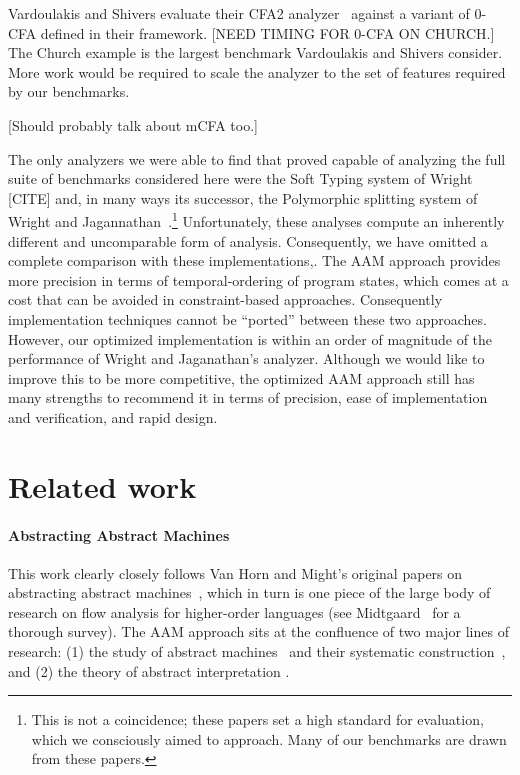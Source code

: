 \documentclass[preprint,onecolumn,9pt]{sigplanconf} %
\begin{document}
Vardoulakis and Shivers evaluate their CFA2
analyzer~\cite{dvanhorn:Vardoulakis2011CFA2} against a variant of 0-CFA
defined in their framework.  [NEED TIMING FOR 0-CFA ON CHURCH.]  The
Church example is the largest benchmark Vardoulakis and Shivers
consider.  More work would be required to scale the analyzer to the
set of features required by our benchmarks.

[Should probably talk about mCFA too.]

The only analyzers we were able to find that proved capable of
analyzing the full suite of benchmarks considered here were the Soft
Typing system of Wright [CITE] and, in many ways its successor, the
Polymorphic splitting system of Wright and
Jagannathan~\cite{dvanhorn:wright-jagannathan-toplas98}.\footnote{This
  is not a coincidence; these papers set a high standard for
  evaluation, which we consciously aimed to approach.  Many of our
  benchmarks are drawn from these papers.}  Unfortunately, these
analyses compute an inherently different and uncomparable form of
analysis.  Consequently, we have omitted a complete comparison with
these implementations,.  The AAM approach provides more precision in
terms of temporal-ordering of program states, which comes at a cost
that can be avoided in constraint-based approaches.  Consequently
implementation techniques cannot be ``ported'' between these two
approaches.  However, our optimized implementation is within an order
of magnitude of the performance of Wright and Jaganathan's analyzer.
Although we would like to improve this to be more competitive, the
optimized AAM approach still has many strengths to recommend it in
terms of precision, ease of implementation and verification, and rapid
design.




\section{Related work}
\label{sec:related}

\paragraph{Abstracting Abstract Machines}

This work clearly closely follows Van Horn and Might's original papers
on abstracting abstract
machines~\cite{dvanhorn:VanHorn2011Abstracting,dvanhorn:VanHorn2012Systematic},
which in turn is one piece of the large body of research on flow
analysis for higher-order languages (see
Midtgaard~\cite{dvanhorn:Midtgaard2011Controlflow} for a thorough
survey).  The AAM approach sits at the confluence of two major lines
of research: (1) the study of abstract
machines~\cite{dvanhorn:landin-64} and their systematic
construction~\cite{dvanhorn:reynolds-hosc98}, and (2) the theory of
abstract interpretation
\cite{dvanhorn:Cousot:1977:AI,dvanhorn:Cousot:1979:Galois}.
\end{document}
